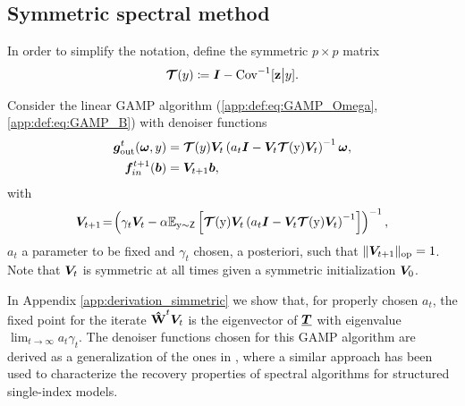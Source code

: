 \subsection{Symmetric spectral method}
In order to simplify the notation, define the symmetric $p \times p$ matrix
\begin{equation}\label{eq:def:preprocessing}
    \boldsymbol{\mathcal{T}}(y) \coloneqq {\boldsymbol I} - \mathrm{Cov}^{-1}[\boldsymbol{\mathbf{z}}\big|y].
\end{equation}
\begin{definition}\label{def:sp_GAMP} 
Consider the linear GAMP algorithm (\ref{app:def:eq:GAMP_Omega},\ref{app:def:eq:GAMP_B}) with denoiser functions
\begin{align}
    {\boldsymbol g}_{\rm out}^t(\boldsymbol{\omega},y) &= \boldsymbol{\mathcal{T}}(y){\boldsymbol V}_t\left(a_t{\boldsymbol I} - {\boldsymbol V}_t\boldsymbol{\mathcal{T}}({ \mathrm{y} }){\boldsymbol V}_t\right)^{-1}\boldsymbol{\omega},\\
    \boldsymbol{f}_{in}^{t+1}(\bm{b}) &= {\boldsymbol V}_{t+1}\bm{b},
\end{align}
with
\begin{equation}\label{eq:symmetric_se_V}
    {\boldsymbol V}_{t+1} \!=\! \left(\gamma_t{\boldsymbol V}_t -\alpha\mathbb{E}_{{ \mathrm{y} }\sim\mathsf{Z}}\left[\boldsymbol{\mathcal{T}}({ \mathrm{y} }){\boldsymbol V}_t\left(a_t{\boldsymbol I} - {\boldsymbol V}_t\boldsymbol{\mathcal{T}}({ \mathrm{y} }){\boldsymbol V}_t\right)^{-1}\right]\right)^{-1},
\end{equation}
$a_t$ a parameter to be fixed  and $\gamma_t$ chosen, a posteriori, such that $ \|{\boldsymbol V}_{t+1} \|_{\mathrm{op}}  = 1$.
Note that ${\boldsymbol V}_t$ is symmetric at all times given a symmetric initialization ${\boldsymbol V}_0$.
\end{definition}
In Appendix \ref{app:derivation_simmetric} we show that, for properly chosen $a_t$, the fixed point for the iterate $\boldsymbol{\mathbf{\hat{W}}}^t{\boldsymbol V}_t$ is the eigenvector of ${\underline{\bm{T}}}$ with eigenvalue $\lim_{t\to\infty}a_t\gamma_t$. The denoiser functions chosen for this GAMP algorithm are derived as a generalization of the ones in \cite{zhang24c}, where a similar approach has been used to characterize the recovery properties of spectral algorithms for structured single-index models. \\  
